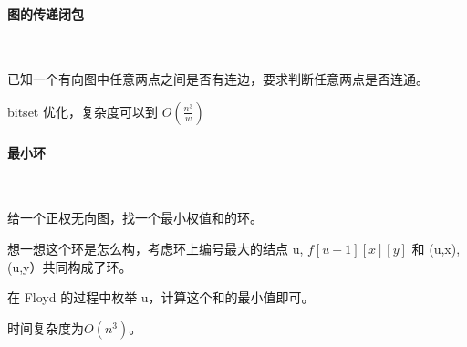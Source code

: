 \paragraph{图的传递闭包}~{}
\par
已知一个有向图中任意两点之间是否有连边，要求判断任意两点是否连通。 \par
bitset 优化，复杂度可以到 $O(\frac{n^3}{w})$ \par
\paragraph{最小环}~{}
\par
给一个正权无向图，找一个最小权值和的环。\par
想一想这个环是怎么构，考虑环上编号最大的结点 u, $f[u-1][x][y]$ 和 (u,x), (u,y）共同构成了环。\par
在 Floyd 的过程中枚举 u，计算这个和的最小值即可。\par
时间复杂度为$O(n^3)$。\par